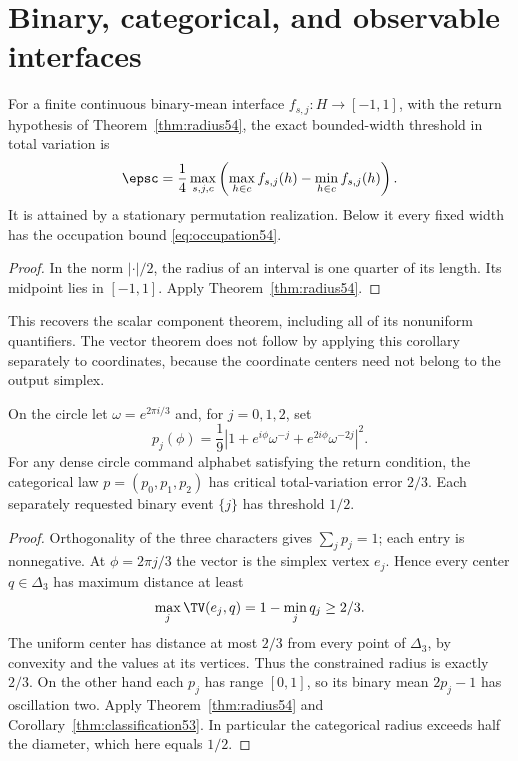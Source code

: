 \section{Binary, categorical, and observable interfaces}\label{sec:observable53}
\begin{corollary}\label{thm:classification53}
For a finite continuous binary-mean interface $f_{s,j}:H\to[-1,1]$, with the return hypothesis of Theorem~\ref{thm:radius54}, the exact bounded-width threshold in total variation is
\begin{equation}\label{eq:critical53}
 \epsc=\frac14\max_{s,j,c}\left(\max_{h\in c}f_{s,j}(h)-\min_{h\in c}f_{s,j}(h)\right).
\end{equation}
It is attained by a stationary permutation realization. Below it every fixed width has the occupation bound \eqref{eq:occupation54}.
\end{corollary}
\begin{proof}
In the norm $|\cdot|/2$, the radius of an interval is one quarter of its length. Its midpoint lies in $[-1,1]$. Apply Theorem~\ref{thm:radius54}.
\end{proof}
This recovers the scalar component theorem, including all of its nonuniform quantifiers. The vector theorem does not follow by applying this corollary separately to coordinates, because the coordinate centers need not belong to the output simplex.

\begin{proposition}\label{prop:categorical54}
On the circle let $\omega=e^{2\pi i/3}$ and, for $j=0,1,2$, set
\[
 p_j(\phi)=\frac19\left|1+e^{i\phi}\omega^{-j}+e^{2i\phi}\omega^{-2j}\right|^2.
\]
For any dense circle command alphabet satisfying the return condition, the categorical law $p=(p_0,p_1,p_2)$ has critical total-variation error $2/3$. Each separately requested binary event $\{j\}$ has threshold $1/2$.
\end{proposition}
\begin{proof}
Orthogonality of the three characters gives $\sum_jp_j=1$; each entry is nonnegative. At $\phi=2\pi j/3$ the vector is the simplex vertex $e_j$. Hence every center $q\in\Delta_3$ has maximum distance at least
\[
 \max_j\TV(e_j,q)=1-\min_jq_j\ge2/3.
\]
The uniform center has distance at most $2/3$ from every point of $\Delta_3$, by convexity and the values at its vertices. Thus the constrained radius is exactly $2/3$. On the other hand each $p_j$ has range $[0,1]$, so its binary mean $2p_j-1$ has oscillation two. Apply Theorem~\ref{thm:radius54} and Corollary~\ref{thm:classification53}. In particular the categorical radius exceeds half the diameter, which here equals $1/2$.
\end{proof}

